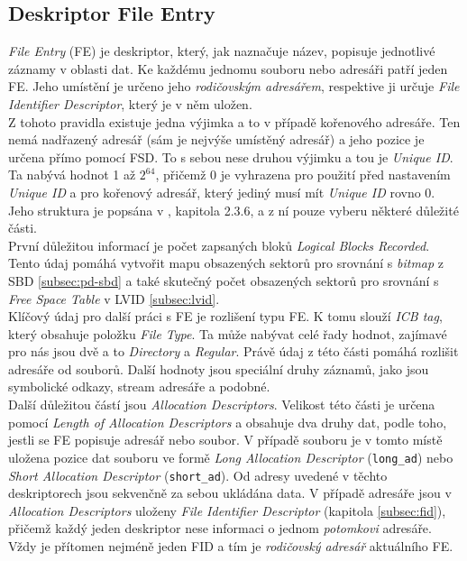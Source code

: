 \subsection{Deskriptor File Entry}
\label{subsec:fe}
\textit{File Entry} (FE) je deskriptor, který, jak naznačuje název, popisuje jednotlivé záznamy v oblasti dat. Ke každému jednomu souboru nebo adresáři patří jeden FE. Jeho umístění je určeno jeho \textit{rodičovským adresářem}, respektive ji určuje \textit{File Identifier Descriptor}, který je v něm uložen.\\
Z tohoto pravidla existuje jedna výjimka a to v případě kořenového adresáře. Ten nemá nadřazený adresář (sám je nejvýše umístěný adresář) a jeho pozice je určena přímo pomocí FSD. To s sebou nese druhou výjimku a tou je \textit{Unique ID}. Ta nabývá hodnot 1 až $2^{64}$, přičemž 0 je vyhrazena pro použití před nastavením \textit{Unique ID} a pro kořenový adresář, který jediný musí mít \textit{Unique ID} rovno 0.\\
Jeho struktura je popsána v \cite{osta-udf-0201}, kapitola 2.3.6, a z ní pouze vyberu některé důležité části.\\
První důležitou informací je počet zapsaných bloků \textit{Logical Blocks Recorded}. Tento údaj pomáhá vytvořit mapu obsazených sektorů pro srovnání s \textit{bitmap} z SBD \ref{subsec:pd-sbd} a také skutečný počet obsazených sektorů pro srovnání s \textit{Free Space Table} v LVID \ref{subsec:lvid}.\\
Klíčový údaj pro další práci s FE je rozlišení typu FE. K tomu slouží \textit{ICB tag}, který obsahuje položku \textit{File Type}. Ta může nabývat celé řady hodnot, zajímavé pro nás jsou dvě a to \textit{Directory} a \textit{Regular}. Právě údaj z této části pomáhá rozlišit adresáře od souborů. Další hodnoty jsou speciální druhy záznamů, jako jsou symbolické odkazy, stream adresáře a podobné.\\ 
Další důležitou částí jsou \textit{Allocation Descriptors}. Velikost této části je určena pomocí \textit{Length of Allocation Descriptors} a obsahuje dva druhy dat, podle toho, jestli se FE popisuje adresář nebo soubor. V případě souboru je v tomto místě uložena pozice dat souboru ve formě \textit{Long Allocation Descriptor} (\texttt{long\_ad}) nebo \textit{Short Allocation Descriptor} (\texttt{short\_ad}). Od adresy uvedené v těchto deskriptorech jsou sekvenčně za sebou ukládána data. V případě adresáře jsou v \textit{Allocation Descriptors} uloženy \textit{File Identifier Descriptor} (kapitola \ref{subsec:fid}), přičemž každý jeden deskriptor nese informaci o jednom \textit{potomkovi} adresáře. Vždy je přítomen nejméně jeden FID a tím je \textit{rodičovský adresář} aktuálního FE.\\
